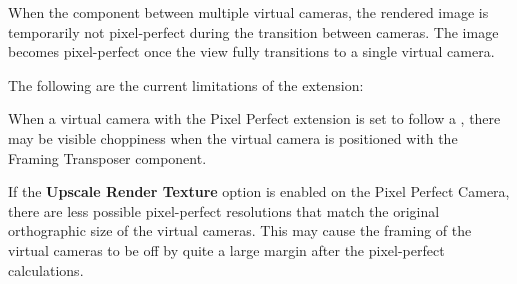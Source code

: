 When the  component  between multiple virtual cameras, the rendered image is temporarily not pixel-\/perfect during the transition between cameras. The image becomes pixel-\/perfect once the view fully transitions to a single virtual camera.

The following are the current limitations of the extension\+:


\begin{DoxyItemize}
\item When a virtual camera with the Pixel Perfect extension is set to follow a , there may be visible choppiness when the virtual camera is positioned with the Framing Transposer component.
\item If the {\bfseries{Upscale Render Texture}} option is enabled on the Pixel Perfect Camera, there are less possible pixel-\/perfect resolutions that match the original orthographic size of the virtual cameras. This may cause the framing of the virtual cameras to be off by quite a large margin after the pixel-\/perfect calculations. 
\end{DoxyItemize}